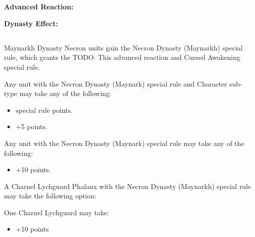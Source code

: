 \section[Necron Factions]{}

\newpage
\subsection[Charnovokh]{}

\textbf{Advanced Reaction:}

\textbf{Dynasty Effect:}


\newpage
\subsection[Maynarkh]{}

Maynarkh Dynasty Necron units gain the Necron Dynasty (Maynarkh) special rule, which grants the TODO: This advanced reaction and Cursed Awakening special rule. 

Any unit with the Necron Dynasty (Maynark) special rule and Character sub-type may take any of the following:
\begin{itemize}
	\item {} special rule  points.
	\item {} \dotfill +5 points.
\end{itemize}

Any unit with the Necron Dynasty (Maynark) special rule may take any of the following:
\begin{itemize}
	\item {} \dotfill +10 points.
\end{itemize}

A Charnel Lychguard Phalanx with the Necron Dynasty (Maynarkh) special rule may take the following option:

One Charnel Lychguard may take:
\begin{itemize}
	\item {} \dotfill +10 points
\end{itemize} 

